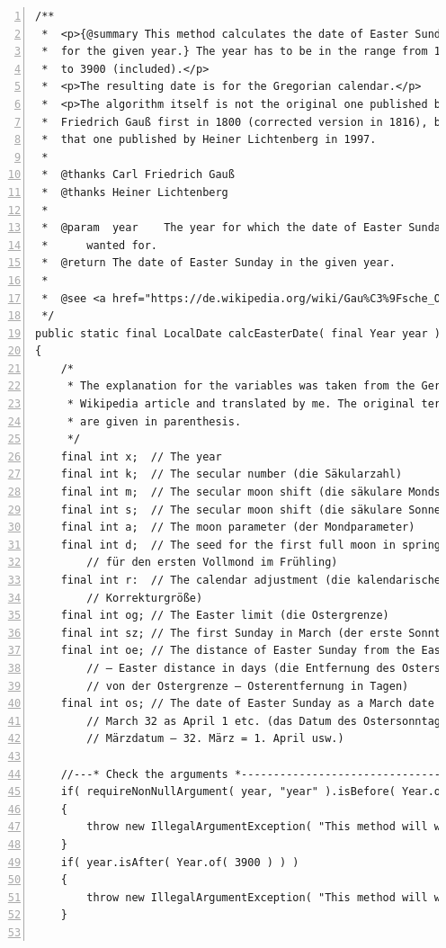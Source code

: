 \documentclass[11pt,a4paper, titlepage, parskip=half, headsepline, footsepline, cleardoublepage=current, headheight=1cm]{scrbook}
\begin{document}
\begin{lstlisting}[numbers=left,caption={Gauss' Easter algorithm\autocite{WIKIPEDIA:DateOfEaster,WIKIPEDIA:Gaussche_Osterformel}},label={listing:GaussEaster}]
/**
 *  <p>{@summary This method calculates the date of Easter Sunday 
 *  for the given year.} The year has to be in the range from 1583 
 *  to 3900 (included).</p>
 *  <p>The resulting date is for the Gregorian calendar.</p>
 *  <p>The algorithm itself is not the original one published by Carl
 *  Friedrich Gauß first in 1800 (corrected version in 1816), but
 *  that one published by Heiner Lichtenberg in 1997.
 *
 *  @thanks Carl Friedrich Gauß
 *  @thanks Heiner Lichtenberg  
 *
 *  @param  year    The year for which the date of Easter Sunday is 
 *      wanted for.
 *  @return The date of Easter Sunday in the given year.
 *  
 *  @see <a href="https://de.wikipedia.org/wiki/Gau%C3%9Fsche_Osterformel">Gaußsche Osterformel</a>
 */
public static final LocalDate calcEasterDate( final Year year )
{
    /*
     * The explanation for the variables was taken from the German
     * Wikipedia article and translated by me. The original terms
     * are given in parenthesis.
     */
    final int x;  // The year
    final int k;  // The secular number (die Säkularzahl)   
    final int m;  // The secular moon shift (die säkulare Mondschaltung)
    final int s;  // The secular moon shift (die säkulare Sonnenschaltung)
    final int a;  // The moon parameter (der Mondparameter)
    final int d;  // The seed for the first full moon in spring (der Keim 
        // für den ersten Vollmond im Frühling)
    final int r:  // The calendar adjustment (die kalendarische
        // Korrekturgröße)
    final int og; // The Easter limit (die Ostergrenze)
    final int sz; // The first Sunday in March (der erste Sonntag im März)
    final int oe; // The distance of Easter Sunday from the Easter limit
        // – Easter distance in days (die Entfernung des Ostersonntags
        // von der Ostergrenze – Osterentfernung in Tagen)
    final int os; // The date of Easter Sunday as a March date with 
        // March 32 as April 1 etc. (das Datum des Ostersonntags als 
        // Märzdatum – 32. März = 1. April usw.)
    
    //---* Check the arguments *-------------------------------------    
    if( requireNonNullArgument( year, "year" ).isBefore( Year.of( 1583 ) ) )
    {
        throw new IllegalArgumentException( "This method will work only for years greater than or equal to 1583" );
    }
    if( year.isAfter( Year.of( 3900 ) ) )
    {
        throw new IllegalArgumentException( "This method will work only for years less than or equal to 3900" );
    }


\end{lstlisting}
\end{document}
